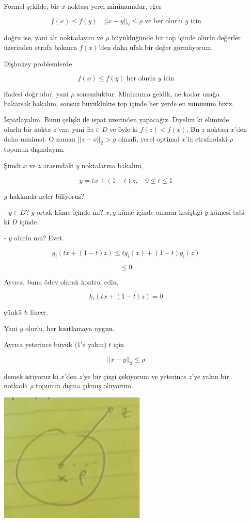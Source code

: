 \documentclass[12pt,fleqn]{article}\usepackage{../../common}
\begin{document}
Formel şekilde, bir $x$ noktası yerel minimumdur, eğer

$$
f(x) \le f(y) \quad ||x-y||_2 \le \rho \textrm{ ve her olurlu } y \textrm{ icin}
$$

doğru ise, yani alt noktadayım ve $\rho$ büyüklüğünde bir top içinde olurlu
değerler üzerinden etrafa bakınca $f(x)$'den daha ufak bir değer
görmüyorum. 

Dişbukey problemlerde 

$$
f(x) \le f(y) \textrm{ her olurlu } y \textrm{ icin}
$$

ifadesi doğrudur, yani $\rho$ sonsuzluktur. Minimuma geldik, ne kadar uzağa
bakarsak bakalım, sonsuz büyüklükte top içinde her yerde en minimum biziz.

İspatlayalım. Bunu çelişki ile ispat üzerinden yapacağız. Diyelim ki
elimizde olurlu bir nokta $z$ var, yani $\exists z \in D$ ve öyle ki 
$f(z) < f(x)$. Bu $z$ noktası $x$'den daha minimal. O zaman $||z-x||_2 >
\rho$ olmali, yerel optimal $x$'in etrafındaki $\rho$ topunun dışındayım. 

Şimdi $x$ ve $z$ arasındaki $y$ noktalarına bakalım, 

$$
y = tx + (1-t) z, \quad 0 \le t \le 1
$$

$y$ hakkında neler biliyoruz? 

- $y \in D$? $y$ ortak küme içinde mi? $x,y$ küme içinde onların kesiştiği
$y$ kümesi tabi ki $D$ içinde. 

- $y$ olurlu mu? Evet. 

$$
g_i(tx + (1-t) z) \le t g_i(x) + (1-t) g_i(z)
$$

$$
\le 0
$$

Ayrıca, bunu ödev olarak kontrol edin,

$$
h_i(tx + (1-t) z) = 0
$$

çünkü $h$ lineer. 

Yani $y$ olurlu, her kısıtlamaya uygun. 

Ayrıca yeterince büyük (1'e yakın) $t$ için 

$$
||x-y||_2 \le \rho
$$

demek istiyoruz ki $x$'den $z$'ye bir çizgi çekiyorum ve yeterince $z$'ye
yakın bir notkada $\rho$ topunun dışına çıkmış oluyorum. 

\includegraphics[width=20em]{func_19_intro_06.png}
\end{document}
